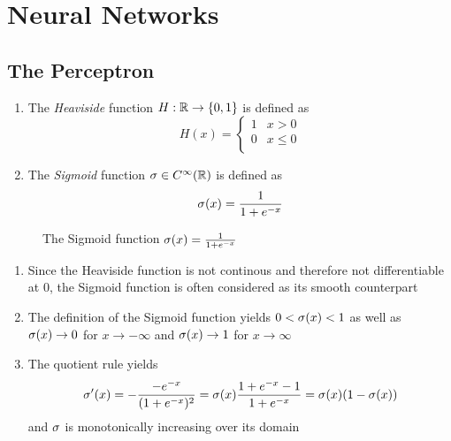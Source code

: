 \newpage
\section{Neural Networks}

\subsection{The Perceptron}

\begin{definition}\hfill
    \begin{enumerate}
		\item The \emph{Heaviside} function \( H: \mathbb{R} \to \{ 0, 1 \} \) is defined as
			\[
				H(x) = \left\{
					\begin{array}{ll}
						1 & x > 0 \\
						0 & x \le 0 \\
					\end{array} 
				\right.
			\]
		\item The \emph{Sigmoid} function \( \sigma \in C^\infty(\mathbb{R}) \) is defined as 
			\[
				\sigma(x) = \frac{1}{1 + e^{-x}}
			\]
    \end{enumerate}
\end{definition}
\bigskip


\begin{figure}[H]
	\centering
	\plotsigmoid
	\caption{The Sigmoid function $ \sigma(x) = \frac{1}{1 + e^{-x}} $}\label{fig:sigmoid}
\end{figure}
\bigskip


\begin{remarks}\hfill
    \begin{enumerate}
		\item Since the Heaviside function is not continous and therefore not differentiable at \( 0 \), 
			the Sigmoid function is often considered as its smooth counterpart
		\item The definition of the Sigmoid function yields \( 0 < \sigma(x) <  1 \) as well as 
			\( \sigma(x) \to 0 \) for \( x \to -\infty \) and \( \sigma(x) \to 1 \) for \( x \to \infty \)
		\item The quotient rule yields
			\[
				\sigma'(x) 
					= -\frac{-e^{-x}}{(1 + e^{-x})^2}
					= \sigma(x) \frac{1 + e^{-x} - 1}{1 + e^{-x}}
					= \sigma(x)(1 - \sigma(x))
			\]
			and \( \sigma \) is monotonically increasing over its domain
    \end{enumerate}
\end{remarks}
\bigskip

